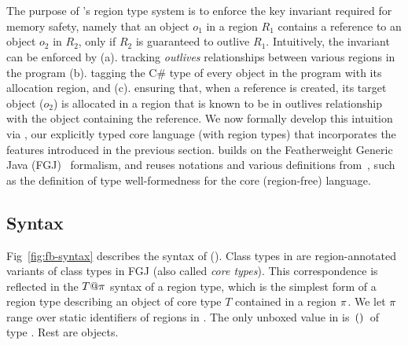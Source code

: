 \section{\fbname}
\label{sec:type-system}

The purpose of \name's region type system is to enforce the key
invariant required for memory safety, namely that an object $o_1$ in a
region $R_1$ contains a reference to an object $o_2$ in $R_2$, only if
$R_2$ is guaranteed to outlive $R_1$. Intuitively, the invariant can
be enforced by (a). tracking \emph{outlives} relationships between
various regions in the program (b). tagging the C\# type of every
object in the program with its allocation region, and (c).  ensuring
that, when a reference is created, its target object ($o_2$) is
allocated in a region that is known to be in outlives relationship
with the object containing the reference. We now formally develop this
intuition via \fbname, our explicitly typed core language (with region
types) that incorporates the features introduced in the previous
section. \fbname builds on the Featherweight Generic Java
(FGJ)~\cite{fgj} formalism, and reuses notations and various
definitions from~\cite{fgj}, such as the definition of type
well-formedness for the core (region-free) language. 


\subsection{Syntax}
\label{sec:fb-syntax}



Fig~\ref{fig:fb-syntax} describes the syntax of \fbname (\FB). Class
types in \FB are region-annotated variants of class types in FGJ (also
called \emph{core types}). This correspondence is reflected in the
$T@\pi$ syntax of a region type, which is the simplest form of a
region type describing an object of core type $T$ contained in a
region $\pi$. We let $\pi$ range over static identifiers of regions
in \FB. The only unboxed value in \FB is $\,{\tt ()}\,$ of type \unitZ.
Rest are objects.

